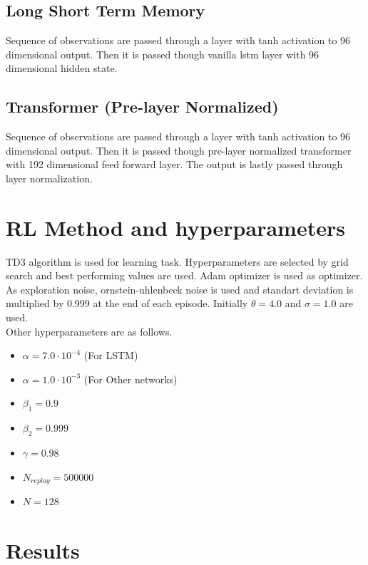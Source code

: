 \subsection{Long Short Term Memory}
Sequence of observations are passed through a layer with tanh activation to 96 dimensional output. Then it is passed though vanilla lstm layer with 96 dimensional hidden state.

\subsection{Transformer (Pre-layer Normalized)}
Sequence of observations are passed through a layer with tanh activation to 96 dimensional output. Then it is passed though pre-layer normalized transformer with 192 dimensional feed forward layer. The output is lastly passed through layer normalization.


\section{RL Method and hyperparameters}
TD3 algorithm is used for learning task. Hyperparameters are selected by grid search and best performing values are used. Adam optimizer is used as optimizer. \\
As exploration noise, ornstein-uhlenbeck noise is used and standart deviation is multiplied  by $0.999$ at the end of each episode. Initially $\theta=4.0$ and $\sigma=1.0$ are used. \\
Other hyperparameters are as follows. \\
\begin{itemize}
	\item $\alpha=7.0 \cdot 10^{-4}$ (For LSTM)
	\item $\alpha=1.0 \cdot 10^{-3}$ (For Other networks)
	\item $\beta_1=0.9$
	\item $\beta_2=0.999$
	\item $\gamma=0.98$
	\item $N_{replay} = 500000$
	\item $N = 128$
\end{itemize}

\section{Results}

